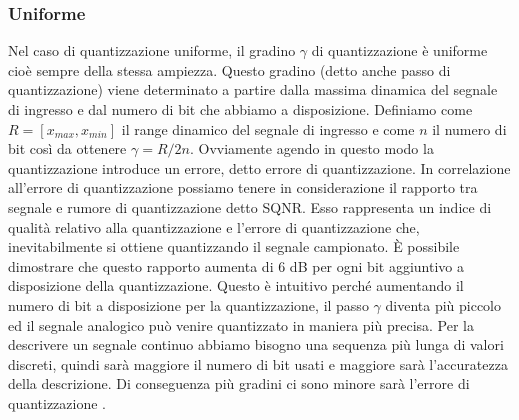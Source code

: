 \documentclass[a4paper]{report} %
\begin{document}
\subsubsection{Uniforme}
Nel caso di quantizzazione uniforme, il gradino $\gamma$ di quantizzazione è uniforme cioè sempre della stessa ampiezza. Questo gradino (detto anche passo di quantizzazione) viene determinato a partire dalla massima dinamica del segnale di ingresso e dal numero di bit che abbiamo a disposizione. Definiamo come $R=[x_{max},x_{min}]$ il range dinamico del segnale di ingresso e come $n$ il numero di bit così da ottenere $\gamma=R/2n$. Ovviamente agendo in questo modo la quantizzazione introduce un errore, detto errore di quantizzazione. In correlazione all'errore di quantizzazione possiamo tenere in considerazione il rapporto tra segnale e rumore di quantizzazione detto SQNR. Esso rappresenta un indice di qualità relativo alla quantizzazione e l'errore di quantizzazione che, inevitabilmente si ottiene quantizzando il segnale campionato. È possibile dimostrare che questo rapporto aumenta di 6 dB per ogni bit aggiuntivo a disposizione della quantizzazione. Questo è intuitivo perché aumentando il numero di bit a disposizione per la quantizzazione, il passo $\gamma$ diventa più piccolo ed il segnale analogico può venire quantizzato in maniera più precisa. Per la descrivere un segnale continuo abbiamo bisogno una sequenza più lunga di valori discreti, quindi sarà maggiore il numero di bit usati e maggiore sarà l'accuratezza della descrizione. Di conseguenza più gradini ci sono minore sarà l'errore di quantizzazione \cite{art:rif.4}.  
\end{document}
